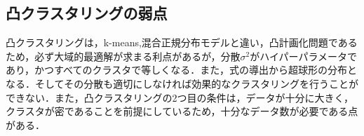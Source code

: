 \documentclass[a4j]{jsarticle}
\begin{document}
\subsection{凸クラスタリングの弱点}
凸クラスタリングは，k-means,混合正規分布モデルと違い，凸計画化問題であるため，必ず大域的最適解が求まる利点があるが，分散$\sigma^2$がハイパーパラメータであり，かつすべてのクラスタで等しくなる．また，式の導出から超球形の分布となる．そしてその分散も適切にしなければ効果的なクラスタリングを行うことができない．また，凸クラスタリングの2つ目の条件は，データが十分に大きく，クラスタが密であることを前提にしているため，十分なデータ数が必要である点がある．

\end{document}
